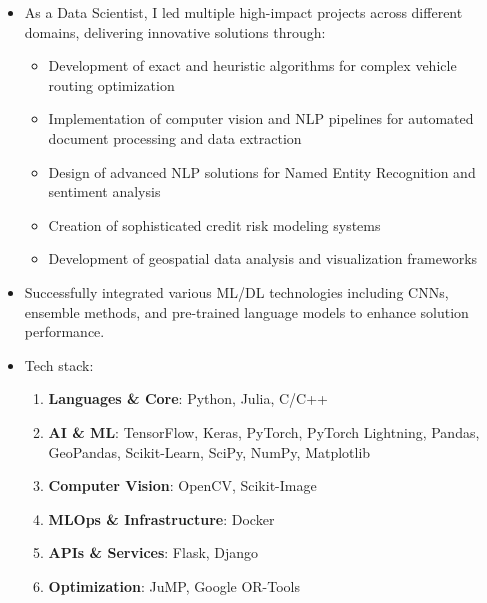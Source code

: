 {  
  \begin{itemize}
    \item As a Data Scientist, I led multiple high-impact projects across different domains, delivering innovative solutions through:
      \begin{itemize}
        \item Development of exact and heuristic algorithms for complex vehicle routing optimization
        \item Implementation of computer vision and NLP pipelines for automated document processing and data extraction
        \item Design of advanced NLP solutions for Named Entity Recognition and sentiment analysis
        \item Creation of sophisticated credit risk modeling systems
        \item Development of geospatial data analysis and visualization frameworks
      \end{itemize}
    \item Successfully integrated various ML/DL technologies including CNNs, ensemble methods, and pre-trained language models to enhance solution performance.
    \item Tech stack:
      \begin{enumerate}
        \item \textbf{Languages \& Core}: {\color{accent2}Python, Julia, C/C++}
        \item \textbf{AI \& ML}: {\color{accent2}TensorFlow, Keras, PyTorch, PyTorch Lightning, Pandas, GeoPandas, Scikit-Learn, SciPy, NumPy, Matplotlib}
        \item \textbf{Computer Vision}: {\color{accent2}OpenCV, Scikit-Image}
        \item \textbf{MLOps \& Infrastructure}: {\color{accent2}Docker}
        \item \textbf{APIs \& Services}: {\color{accent2}Flask, Django}
        \item \textbf{Optimization}: {\color{accent2}JuMP, Google OR-Tools}
      \end{enumerate}
  \end{itemize}

\divider}